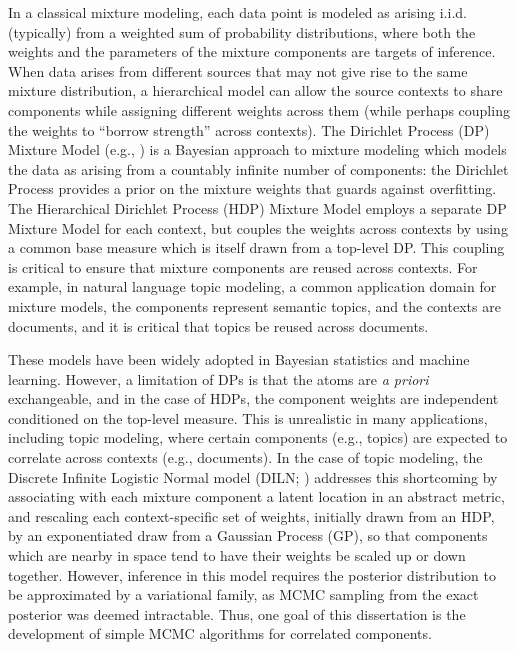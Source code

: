 



In a classical mixture modeling, each data point is modeled as arising
i.i.d. (typically) from a weighted sum of probability distributions,
where both the weights and the parameters of the mixture components
are targets of inference.  When data arises from different sources
that may not give rise to the same mixture distribution, a
hierarchical model can allow the source contexts to share components while
assigning different weights across them (while perhaps coupling the
weights to ``borrow strength'' across contexts).  The Dirichlet
Process (DP) Mixture Model (e.g., \citet{rasmussen2000infinite}) is a Bayesian
approach to mixture modeling which models the data as arising from a countably
infinite number of components: the Dirichlet Process provides a prior
on the mixture weights that guards against overfitting.  The Hierarchical 
Dirichlet Process (HDP) Mixture Model \citep{teh2006hierarchical} employs
a separate DP Mixture Model for each context, but
couples the weights across contexts by using a common base measure which is
itself drawn from a top-level DP.  This coupling is critical to ensure
that mixture components are reused across contexts.
For example, in natural language topic modeling, a common application
domain for mixture models, the components represent semantic topics,
and the contexts are documents, and it is critical that topics be reused
across documents.

These models have been widely adopted in Bayesian statistics and
machine learning.  However, a limitation of DPs is that the atoms
are {\it a priori} exchangeable, and in the case of HDPs, the
component weights are independent conditioned on the top-level
measure.  This is unrealistic in many applications, including topic modeling, where certain
components (e.g., topics) are expected to correlate across contexts
(e.g., documents).  In the case of topic modeling, the Discrete
Infinite Logistic Normal model (DILN; \citet{paisley2011discrete}) addresses
this shortcoming by associating with each mixture component a latent
location in an abstract metric, and rescaling each context-specific
set of weights, initially drawn from an HDP, 
by an exponentiated draw from a Gaussian Process (GP), so that
components which are nearby in space tend to have their weights be
scaled up or down together.  However, inference in this model requires
the posterior distribution to be approximated by a variational family,
as MCMC sampling from the exact posterior was deemed intractable.
Thus, one goal of this dissertation is the development of simple MCMC
algorithms for correlated components.

